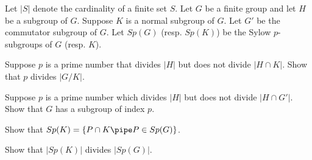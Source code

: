 Let $|S|$ denote the cardinality of a finite set $S$. Let $G$ be a
finite group and let $H$ be a subgroup of $G$. Suppose $K$ is a normal
subgroup of $G$. Let $G'$ be the commutator subgroup of $G$. Let
$Sp(G)$ (resp. $Sp(K)$) be the Sylow $p$-subgroups of $G$ (resp. $K$).
\begin{alist}
\item Suppose $p$ is a prime number that divides $|H|$ but does not
divide $|H\cap K|$. Show that $p$ divides $|G/K|$.
\item  Suppose $p$ is a
prime number which divides $|H|$ but does not divide $|H\cap
G'|$. Show that $G$ has a subgroup of index $p$. 
\item Show that $Sp(K)=\{P\cap K \pipe  P\in Sp(G)\}$.
\item Show that  $|Sp(K)|$ divides $|Sp(G)|$.
\end{alist}

